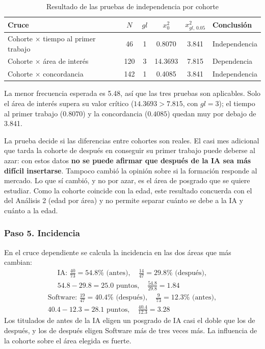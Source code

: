 \documentclass[12pt, a4paper]{article}
\newenvironment{mitabla}[2][H]{%
  \begin{table}[#1]
  \centering
  \caption{#2}
  \small
}{%
  \end{table}
}
\begin{document}
\begin{mitabla}{Resultado de las pruebas de independencia por cohorte}\label{tab:a4-indep}
\begin{tabular}{lccccl}
\toprule
\textbf{Cruce} & \textbf{$N$} & \textbf{$gl$} & \textbf{$x_0^2$} & \textbf{$x^2_{gl,\,0.05}$} & \textbf{Conclusión} \\
\midrule
Cohorte $\times$ tiempo al primer trabajo & 46 & 1 & 0.8070 & 3.841 & Independencia \\
Cohorte $\times$ área de interés & 120 & 3 & 14.3693 & 7.815 & Dependencia \\
Cohorte $\times$ concordancia & 142 & 1 & 0.4085 & 3.841 & Independencia \\
\bottomrule
\end{tabular}
\end{mitabla}

La menor frecuencia esperada es 5.48, así que las tres pruebas son
aplicables. Solo el área de interés supera su valor crítico ($14.3693 >
7.815$, con $gl = 3$); el tiempo al primer trabajo ($0.8070$) y la
concordancia ($0.4085$) quedan muy por debajo de 3.841.

La prueba decide si las diferencias entre cohortes son reales. El casi
mes adicional que tarda la cohorte de después en conseguir su primer
trabajo puede deberse al azar: con estos datos \textbf{no se puede
afirmar que después de la IA sea más difícil insertarse}. Tampoco cambió
la opinión sobre si la formación responde al mercado. Lo que sí cambió, y
no por azar, es el área de posgrado que se quiere estudiar. Como la
cohorte coincide con la edad, este resultado concuerda con el del
Análisis 2 (edad por área) y no permite separar cuánto se debe a la IA y
cuánto a la edad.

\subsubsection{Paso 5. Incidencia}

En el cruce dependiente se calcula la incidencia en las dos áreas que
más cambian:
\begin{gather*}
\text{IA: } \frac{40}{73} = 54.8\% \text{ (antes)}, \quad \frac{14}{47} = 29.8\% \text{ (después)}, \\
54.8 - 29.8 = 25.0 \text{ puntos}, \quad \frac{54.8}{29.8} = 1.84
\end{gather*}
\begin{gather*}
\text{Software: } \frac{19}{47} = 40.4\% \text{ (después)}, \quad \frac{9}{73} = 12.3\% \text{ (antes)}, \\
40.4 - 12.3 = 28.1 \text{ puntos}, \quad \frac{40.4}{12.3} = 3.28
\end{gather*}
Los titulados de antes de la IA eligen un posgrado de IA casi el doble
que los de después, y los de después eligen Software más de tres veces
más. La influencia de la cohorte sobre el área elegida es fuerte.
\end{document}
